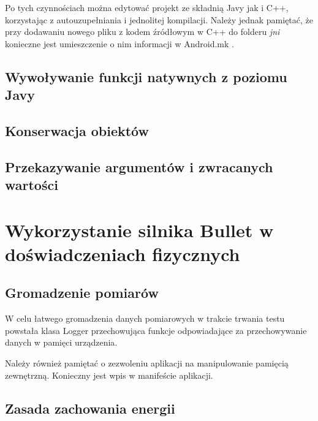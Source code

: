 \documentclass[12pt]{article}
\begin{document}
  Po tych czynnościach można edytować projekt ze składnią Javy jak i C++,
  korzystając z autouzupełniania i jednolitej kompilacji. Należy jednak
  pamiętać, że przy dodawaniu nowego pliku z kodem źródłowym w C++ do folderu
  \emph{jni} konieczne jest umieszczenie o nim informacji w Android.mk .

\subsection{Wywoływanie funkcji natywnych z poziomu Javy}

\subsection{Konserwacja obiektów}

\subsection{Przekazywanie argumentów i zwracanych wartości}

\section{Wykorzystanie silnika Bullet w doświadczeniach fizycznych}

\subsection{Gromadzenie pomiarów}
W celu łatwego gromadzenia danych pomiarowych w trakcie trwania testu powstała
klasa Logger przechowująca funkcje odpowiadające za przechowywanie danych w
pamięci urządzenia.
  
Należy również pamiętać o zezwoleniu aplikacji na manipulowanie pamięcią
zewnętrzną. Konieczny jest wpis w manifeście aplikacji.


\subsection{Zasada zachowania energii}
\end{document}
